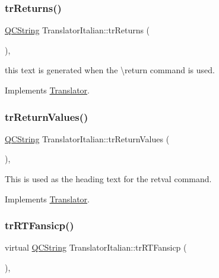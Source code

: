 \subsubsection{\texorpdfstring{trReturns()}{trReturns()}}
{\footnotesize\ttfamily \mbox{\hyperlink{class_q_c_string}{Q\+C\+String}} Translator\+Italian\+::tr\+Returns (\begin{DoxyParamCaption}{ }\end{DoxyParamCaption})\hspace{0.3cm}{\ttfamily [inline]}, {\ttfamily [virtual]}}

this text is generated when the \textbackslash{}return command is used. 

Implements \mbox{\hyperlink{class_translator}{Translator}}.

\mbox{\label{class_translator_italian_a3476ae1f6424a0ef6b7d69c40497c676}} 
\subsubsection{\texorpdfstring{trReturnValues()}{trReturnValues()}}
{\footnotesize\ttfamily \mbox{\hyperlink{class_q_c_string}{Q\+C\+String}} Translator\+Italian\+::tr\+Return\+Values (\begin{DoxyParamCaption}{ }\end{DoxyParamCaption})\hspace{0.3cm}{\ttfamily [inline]}, {\ttfamily [virtual]}}

This is used as the heading text for the retval command. 

Implements \mbox{\hyperlink{class_translator}{Translator}}.

\mbox{\label{class_translator_italian_a27b5da596f7778f5167ea53e5294f418}} 
\subsubsection{\texorpdfstring{trRTFansicp()}{trRTFansicp()}}
{\footnotesize\ttfamily virtual \mbox{\hyperlink{class_q_c_string}{Q\+C\+String}} Translator\+Italian\+::tr\+R\+T\+Fansicp (\begin{DoxyParamCaption}{ }\end{DoxyParamCaption})\hspace{0.3cm}{\ttfamily [inline]}, {\ttfamily [virtual]}}

